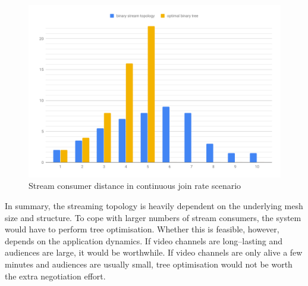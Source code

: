 \begin{figure}
\centering
\includegraphics[width=1\textwidth]{graphics/analysis/streaming-topology-continuous-histo.pdf}
\caption{Stream consumer distance in continuous join rate scenario}
\label{fig:streaming-topology-continuous-histo}
\end{figure}

In summary, the streaming topology is heavily dependent on the underlying mesh size and structure. To cope with larger numbers of stream consumers, the system would have to perform tree optimisation. Whether this is feasible, however, depends on the application dynamics. If video channels are long–lasting and audiences are large, it would be worthwhile. If video channels are only alive a few minutes and audiences are usually small, tree optimisation would not be worth the extra negotiation effort.
